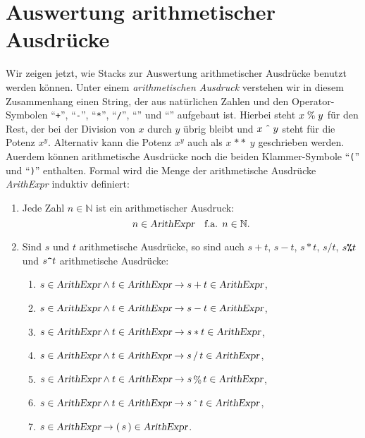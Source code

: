 \section{Auswertung arithmetischer Ausdr\"ucke}
Wir zeigen jetzt, wie Stacks zur Auswertung arithmetischer Ausdr\"ucke benutzt werden
k\"onnen.  Unter einem \emph{arithmetischen Ausdruck} verstehen wir in diesem Zusammenhang
einen String, der aus nat\"urlichen Zahlen und den Operator-Symbolen ``\texttt{+}'',
``\texttt{-}'', ``\texttt{*}'', ``\texttt{/}'', ``\texttt{}'' und
``\texttt{}'' aufgebaut ist.  Hierbei steht $x \;\mathtt{\symbol{37}}\; y$ f\"ur
den Rest, der bei der Division von $x$ durch $y$ \"ubrig bleibt und
$x\;\mathtt{\symbol{94}}\;y$ steht f\"ur die Potenz $x^y$.  Alternativ kann die Potenz $x^y$
auch als $x \;\mathtt{**}\; y$ geschrieben werden.
Au\3erdem k\"onnen arithmetische
Ausdr\"ucke noch die beiden Klammer-Symbole ``\texttt{(}'' und ``\texttt{)}'' enthalten.  
Formal wird die Menge der arithmetische Ausdr\"ucke \textsl{ArithExpr} induktiv definiert:
\begin{enumerate}
\item Jede Zahl $n \in \mathbb{N}$ ist ein arithmetischer Ausdruck:
      \[ n \in \textsl{ArithExpr} \quad \mbox{f.a. $n \in \mathbb{N}$}. \]
\item Sind $s$ und $t$ arithmetische Ausdr\"ucke, so sind auch $s + t$, $s - t$, $s * t$, 
      $s / t$, $s \texttt{\symbol{37}} t$ und $s \texttt{\symbol{94}} t$
      arithmetische Ausdr\"ucke:
      \begin{enumerate}
      \item $s \in \textsl{ArithExpr} \wedge t \in \textsl{ArithExpr} \rightarrow s + t \in \textsl{ArithExpr}$,
      \item $s \in \textsl{ArithExpr} \wedge t \in \textsl{ArithExpr} \rightarrow s - t \in \textsl{ArithExpr}$,
      \item $s \in \textsl{ArithExpr} \wedge t \in \textsl{ArithExpr} \rightarrow s * t \in \textsl{ArithExpr}$,
      \item $s \in \textsl{ArithExpr} \wedge t \in \textsl{ArithExpr} \rightarrow s \mathop{/} t \in \textsl{ArithExpr}$,
      \item $s \in \textsl{ArithExpr} \wedge t \in \textsl{ArithExpr} \rightarrow s
        \mathop{\symbol{37}} t \in \textsl{ArithExpr}$,
      \item $s \in \textsl{ArithExpr} \wedge t \in \textsl{ArithExpr} \rightarrow s \mathop{\symbol{94}} t \in \textsl{ArithExpr}$,
      \item $s \in \textsl{ArithExpr} \rightarrow (\, s\,) \in \textsl{ArithExpr}$.
      \end{enumerate}
\end{enumerate}
